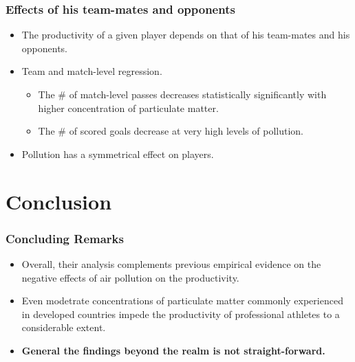 \documentclass[dvipdfmx,11pt]{beamer}
\begin{document}
\begin{frame}\frametitle{Effects of his team-mates and opponents}
  \begin{itemize}
    \item The productivity of a given player depends on that of his team-mates and his opponents.
    \item Team and match-level regression.
    \begin{itemize}
      \item The \# of match-level passes decreases statistically significantly with higher concentration of particulate matter.
      \item The \# of scored goals decrease at very high levels of pollution.
    \end{itemize}
    \item Pollution has a symmetrical effect on players.
  \end{itemize}
\end{frame}

\section{Conclusion}

\begin{frame}\frametitle{Concluding Remarks}
  \begin{itemize}
    \item Overall, their analysis complements previous empirical evidence on the negative effects of air pollution on the productivity.
    \item Even modetrate concentrations of particulate matter commonly experienced in developed countries impede the productivity of professional athletes to a considerable extent.
    \item \textbf{General the findings beyond the realm is not straight-forward.}
  \end{itemize}
\end{frame}
\end{document}
